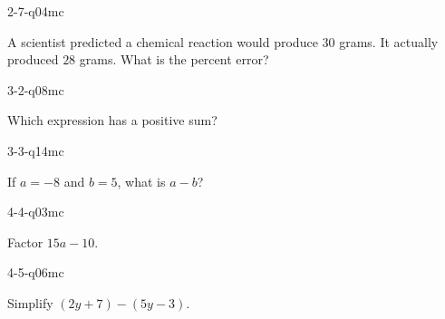 \begin{practiceQuestion}{2-7-q04}{mc}
\begin{questionText}
A scientist predicted a chemical reaction would produce $30$ grams. It actually produced $28$ grams. What is the percent error?
\end{questionText}
\end{practiceQuestion}

\begin{practiceQuestion}{3-2-q08}{mc}
\begin{questionText}
Which expression has a positive sum?
\end{questionText}
\end{practiceQuestion}

\begin{practiceQuestion}{3-3-q14}{mc}
\begin{questionText}
If $a = -8$ and $b = 5$, what is $a - b$?
\end{questionText}
\end{practiceQuestion}

\begin{practiceQuestion}{4-4-q03}{mc}
\begin{questionText}
Factor $15a - 10$.
\end{questionText}
\end{practiceQuestion}

\begin{practiceQuestion}{4-5-q06}{mc}
\begin{questionText}
Simplify $(2y + 7) - (5y - 3)$.
\end{questionText}
\end{practiceQuestion}

